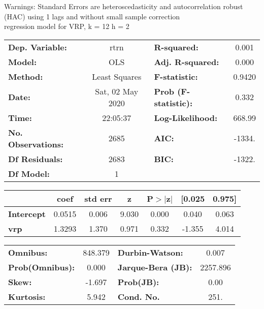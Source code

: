Warnings: \newline
 [1] Standard Errors are heteroscedasticity and autocorrelation robust (HAC) using 1 lags and without small sample correction\\ 

regression model for VRP, k = 12 h = 2\begin{center}
\begin{tabular}{lclc}
\toprule
\textbf{Dep. Variable:}    &       rtrn       & \textbf{  R-squared:         } &     0.001   \\
\textbf{Model:}            &       OLS        & \textbf{  Adj. R-squared:    } &     0.000   \\
\textbf{Method:}           &  Least Squares   & \textbf{  F-statistic:       } &    0.9420   \\
\textbf{Date:}             & Sat, 02 May 2020 & \textbf{  Prob (F-statistic):} &    0.332    \\
\textbf{Time:}             &     22:05:37     & \textbf{  Log-Likelihood:    } &    668.99   \\
\textbf{No. Observations:} &        2685      & \textbf{  AIC:               } &    -1334.   \\
\textbf{Df Residuals:}     &        2683      & \textbf{  BIC:               } &    -1322.   \\
\textbf{Df Model:}         &           1      & \textbf{                     } &             \\
\bottomrule
\end{tabular}
\begin{tabular}{lcccccc}
                   & \textbf{coef} & \textbf{std err} & \textbf{z} & \textbf{P$> |$z$|$} & \textbf{[0.025} & \textbf{0.975]}  \\
\midrule
\textbf{Intercept} &       0.0515  &        0.006     &     9.030  &         0.000        &        0.040    &        0.063     \\
\textbf{vrp}       &       1.3293  &        1.370     &     0.971  &         0.332        &       -1.355    &        4.014     \\
\bottomrule
\end{tabular}
\begin{tabular}{lclc}
\textbf{Omnibus:}       & 848.379 & \textbf{  Durbin-Watson:     } &    0.007  \\
\textbf{Prob(Omnibus):} &   0.000 & \textbf{  Jarque-Bera (JB):  } & 2257.896  \\
\textbf{Skew:}          &  -1.697 & \textbf{  Prob(JB):          } &     0.00  \\
\textbf{Kurtosis:}      &   5.942 & \textbf{  Cond. No.          } &     251.  \\
\bottomrule
\end{tabular}
\end{center}

